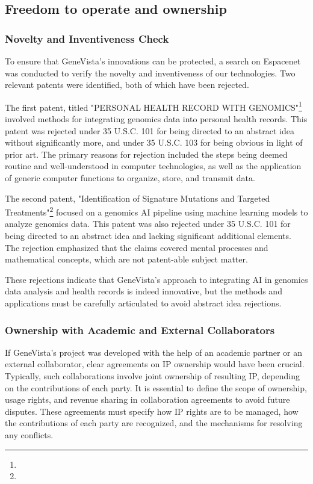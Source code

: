 \documentclass[a4paper]{article}
\begin{document}
\subsection{Freedom to operate and ownership}

\subsubsection{Novelty and Inventiveness Check}
To ensure that GeneVista's innovations can be protected, a search on Espacenet was conducted to verify the novelty and inventiveness of our technologies. Two relevant patents were identified, both of which have been rejected.

The first patent, titled "PERSONAL HEALTH RECORD WITH GENOMICS"\footnote{\firstpat} involved methods for integrating genomics data into personal health records. This patent was rejected under 35 U.S.C. 101 for being directed to an abstract idea without significantly more, and under 35 U.S.C. 103 for being obvious in light of prior art. The primary reasons for rejection included the steps being deemed routine and well-understood in computer technologies, as well as the application of generic computer functions to organize, store, and transmit data.

The second patent, "Identification of Signature Mutations and Targeted Treatments"\footnote{\secpat} focused on a genomics AI pipeline using machine learning models to analyze genomics data. This patent was also rejected under 35 U.S.C. 101 for being directed to an abstract idea and lacking significant additional elements. The rejection emphasized that the claims covered mental processes and mathematical concepts, which are not patent-able subject matter.

These rejections indicate that GeneVista's approach to integrating AI in genomics data analysis and health records is indeed innovative, but the methods and applications must be carefully articulated to avoid abstract idea rejections.

\subsubsection{Ownership with Academic and External Collaborators}

If GeneVista's project was developed with the help of an academic partner or an external collaborator, clear agreements on IP ownership would have been crucial. Typically, such collaborations involve joint ownership of resulting IP, depending on the contributions of each party. It is essential to define the scope of ownership, usage rights, and revenue sharing in collaboration agreements to avoid future disputes. These agreements must specify how IP rights are to be managed, how the contributions of each party are recognized, and the mechanisms for resolving any conflicts.
\end{document}
